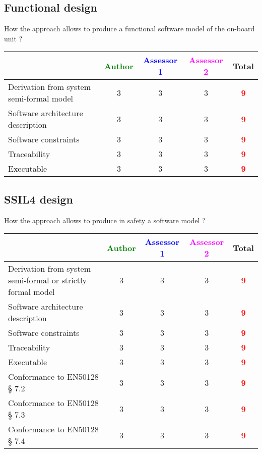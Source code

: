 \subsection{Functional design}

How the approach allows to  produce a functional software model of the on-board unit ?

\begin{tabular}{|l | c | c | c | c|}
\hline
& \textcolor{green}{Author} & \textcolor{blue}{Assessor 1} & \textcolor{magenta}{Assessor 2} & Total \\
\hline
Derivation from system semi-formal model  & 3    & 3    & 3    & \textcolor{red}{\textbf{9}} \\
\hline 
Software architecture description  & 3    & 3    & 3    & \textcolor{red}{\textbf{9}} \\
\hline
Software constraints  & 3    & 3    & 3    & \textcolor{red}{\textbf{9}} \\
\hline
Traceability  & 3    & 3    & 3    & \textcolor{red}{\textbf{9}} \\
\hline
Executable  & 3     & 3    & 3    & \textcolor{red}{\textbf{9}} \\
\hline
\end{tabular}

\subsection{SSIL4 design}

How the approach allows to  produce in safety a software model ?

\begin{tabular}{|l | c | c | c | c|}
\hline
& \textcolor{green}{Author} & \textcolor{blue}{Assessor 1} & \textcolor{magenta}{Assessor 2} & Total \\
\hline
Derivation from system semi-formal or strictly formal model  & 3    & 3    & 3    & \textcolor{red}{\textbf{9}} \\
\hline 
Software architecture description  & 3    & 3    & 3    & \textcolor{red}{\textbf{9}} \\
\hline
Software constraints  & 3    & 3    & 3    & \textcolor{red}{\textbf{9}} \\
\hline
Traceability  & 3    & 3    & 3    & \textcolor{red}{\textbf{9}}  \\
\hline
Executable  & 3    & 3    & 3    & \textcolor{red}{\textbf{9}} \\
\hline
Conformance to EN50128 § 7.2  & 3    & 3    & 3    & \textcolor{red}{\textbf{9}} \\
\hline
Conformance to EN50128 § 7.3  & 3    & 3    & 3    & \textcolor{red}{\textbf{9}} \\
\hline
Conformance to EN50128 § 7.4  & 3    & 3    & 3    & \textcolor{red}{\textbf{9}} \\
\hline
\end{tabular}

